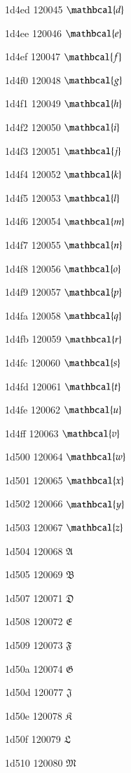 \documentclass[11pt]{article}
\begin{document}
1d4ed 120045 \ensuremath{\mathbcal{d}}

1d4ee 120046 \ensuremath{\mathbcal{e}}

1d4ef 120047 \ensuremath{\mathbcal{f}}

1d4f0 120048 \ensuremath{\mathbcal{g}}

1d4f1 120049 \ensuremath{\mathbcal{h}}

1d4f2 120050 \ensuremath{\mathbcal{i}}

1d4f3 120051 \ensuremath{\mathbcal{j}}

1d4f4 120052 \ensuremath{\mathbcal{k}}

1d4f5 120053 \ensuremath{\mathbcal{l}}

1d4f6 120054 \ensuremath{\mathbcal{m}}

1d4f7 120055 \ensuremath{\mathbcal{n}}

1d4f8 120056 \ensuremath{\mathbcal{o}}

1d4f9 120057 \ensuremath{\mathbcal{p}}

1d4fa 120058 \ensuremath{\mathbcal{q}}

1d4fb 120059 \ensuremath{\mathbcal{r}}

1d4fc 120060 \ensuremath{\mathbcal{s}}

1d4fd 120061 \ensuremath{\mathbcal{t}}

1d4fe 120062 \ensuremath{\mathbcal{u}}

1d4ff 120063 \ensuremath{\mathbcal{v}}

1d500 120064 \ensuremath{\mathbcal{w}}

1d501 120065 \ensuremath{\mathbcal{x}}

1d502 120066 \ensuremath{\mathbcal{y}}

1d503 120067 \ensuremath{\mathbcal{z}}

1d504 120068 \ensuremath{\mathfrak{A}}

1d505 120069 \ensuremath{\mathfrak{B}}

1d507 120071 \ensuremath{\mathfrak{D}}

1d508 120072 \ensuremath{\mathfrak{E}}

1d509 120073 \ensuremath{\mathfrak{F}}

1d50a 120074 \ensuremath{\mathfrak{G}}

1d50d 120077 \ensuremath{\mathfrak{J}}

1d50e 120078 \ensuremath{\mathfrak{K}}

1d50f 120079 \ensuremath{\mathfrak{L}}

1d510 120080 \ensuremath{\mathfrak{M}}
\end{document}
